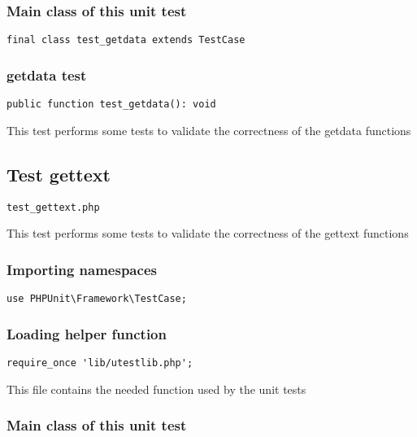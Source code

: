 \documentclass[a4paper]{article}
\begin{document}
\subsubsection{Main class of this unit test}

\begin{lstlisting}
final class test_getdata extends TestCase
\end{lstlisting}

\hypertarget{toc197}{}
\subsubsection{getdata test}

\begin{lstlisting}
public function test_getdata(): void
\end{lstlisting}

This test performs some tests to validate the correctness
of the getdata functions

\hypertarget{toc198}{}
\subsection{Test gettext}

\begin{lstlisting}
test_gettext.php
\end{lstlisting}

This test performs some tests to validate the correctness
of the gettext functions

\hypertarget{toc199}{}
\subsubsection{Importing namespaces}

\begin{lstlisting}
use PHPUnit\Framework\TestCase;
\end{lstlisting}

\hypertarget{toc200}{}
\subsubsection{Loading helper function}

\begin{lstlisting}
require_once 'lib/utestlib.php';
\end{lstlisting}

This file contains the needed function used by the unit tests

\hypertarget{toc201}{}
\subsubsection{Main class of this unit test}
\end{document}
